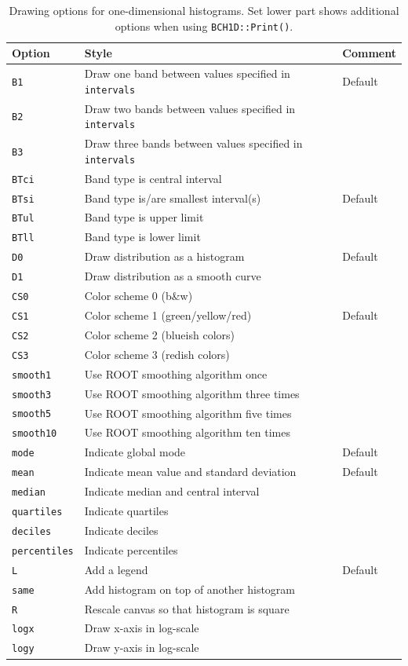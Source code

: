 \documentclass[11pt, a4paper]{article}
\begin{document}
\begin{table}[ht!]
\caption{Drawing options for one-dimensional histograms. Set lower
  part shows additional options when using \texttt{BCH1D::Print()}.
\label{table:draw1d}}
\begin{center}
\begin{tabular}{lll}
\toprule
Option & Style & Comment \\
\midrule
\verb|B1| & Draw one band between values specified in \verb|intervals| & Default  \\
\verb|B2| & Draw two bands between values specified in \verb|intervals| & \\
\verb|B3| & Draw three bands between values specified in \verb|intervals| & \\
\verb|BTci| & Band type is central interval & \\
\verb|BTsi| & Band type is/are smallest interval(s) & Default\\
\verb|BTul| & Band type is upper limit & \\
\verb|BTll| & Band type is lower limit & \\
\verb|D0| & Draw distribution as a histogram & Default \\
\verb|D1| & Draw distribution as a smooth curve & \\
\verb|CS0| & Color scheme 0 (b\&w) & \\
\verb|CS1| & Color scheme 1 (green/yellow/red) & Default  \\
\verb|CS2| & Color scheme 2 (blueish colors) &  \\
\verb|CS3| & Color scheme 3 (redish colors) & \\
\verb|smooth1| & Use ROOT smoothing algorithm once & \\
\verb|smooth3| & Use ROOT smoothing algorithm three times & \\
\verb|smooth5| & Use ROOT smoothing algorithm five times & \\
\verb|smooth10| & Use ROOT smoothing algorithm ten times & \\
\verb|mode| & Indicate global mode & Default \\
\verb|mean| & Indicate mean value and standard deviation & Default \\
\verb|median| & Indicate median and central interval &  \\
\verb|quartiles| & Indicate quartiles & \\
\verb|deciles| & Indicate deciles & \\
\verb|percentiles| & Indicate percentiles & \\
\verb|L| & Add a legend & Default \\
\verb|same| & Add histogram on top of another histogram & \\
\midrule
\verb|R| & Rescale canvas so that histogram is square & \\
\verb|logx| & Draw x-axis in log-scale & \\
\verb|logy| & Draw y-axis in log-scale & \\
\bottomrule
\end{tabular}
\end{center}
\end{table}
\end{document}
